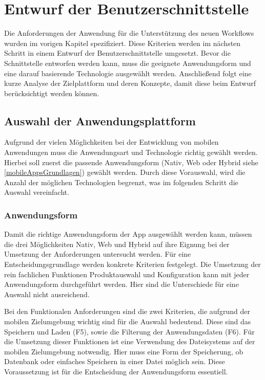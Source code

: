 \chapter{Entwurf der Benutzerschnittstelle}\label{chapter_4}
Die Anforderungen der Anwendung für die Unterstützung des neuen Workflows wurden im vorigen Kapitel spezifiziert. Diese Kriterien werden im nächsten Schritt in einem Entwurf der Benutzerschnittstelle umgesetzt. Bevor die Schnittstelle entworfen werden kann, muss die geeignete Anwendungsform und eine darauf basierende Technologie ausgewählt werden. Anschließend folgt eine kurze Analyse der Zielplattform und deren Konzepte, damit diese beim Entwurf berücksichtigt werden können.

\section{Auswahl der Anwendungsplattform}
Aufgrund der vielen Möglichkeiten bei der Entwicklung von mobilen Anwendungen muss die Anwendungsart und Technologie richtig gewählt werden. Hierbei soll zuerst die passende Anwendungsform (Nativ, Web oder Hybrid siehe \ref{mobileAppsGrundlagen}) gewählt werden. Durch diese Vorauswahl, wird die Anzahl der möglichen Technologien begrenzt, was im folgenden Schritt die Auswahl vereinfacht.


\subsection{Anwendungsform}
Damit die richtige Anwendungsform der App ausgewählt werden kann, müssen die drei Möglichkeiten Nativ, Web und Hybrid auf ihre Eignung bei der Umsetzung der Anforderungen untersucht werden. Für eine Entscheidungsgrundlage werden konkrete Kriterien festgelegt. 
Die Umsetzung der rein fachlichen Funktionen Produktauswahl und Konfiguration kann mit jeder Anwendungsform durchgeführt werden. Hier sind die Unterschiede für eine Auswahl nicht ausreichend. \par

Bei den  Funktionalen Anforderungen sind die zwei Kriterien, die aufgrund der mobilen Zielumgebung wichtig sind für die Auswahl bedeutend. Diese sind das Speichern und Laden (F5), sowie die Filterung der Anwendungsdaten (F6). Für die Umsetzung dieser Funktionen ist eine Verwendung des Dateisystems auf der mobilen Zielumgebung notwendig. Hier muss eine Form der Speicherung, ob Datenbank oder einfaches Speichern in einer Datei möglich sein. Diese Voraussetzung ist für die Entscheidung der Anwendungsform essentiell. \par

